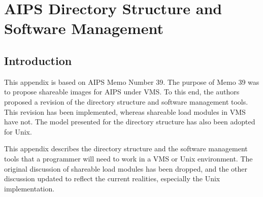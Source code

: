 \setcounter{chapter}{0} %
\chapter{AIPS Directory Structure and Software Management}
\setcounter{page}{1}
\section{Introduction}
This appendix is based on AIPS Memo Number 39.  The purpose of Memo 39
was to propose shareable images for AIPS under VMS.  To this end, the
authors proposed a revision of the directory structure and software
management tools.  This revision has been implemented, whereas
shareable load modules in VMS have not.  The model presented for the
directory structure has also been adopted for Unix.

This appendix describes the directory structure and the software
management tools that a programmer will need to work in a VMS or Unix
environment.  The original discussion of shareable load modules has
been dropped, and the other discussion updated to reflect the current
realities, especially the Unix implementation.


